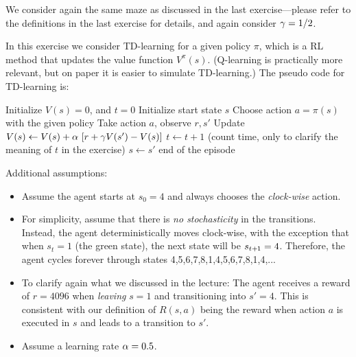 

\renewcommand{\course}{Artificial Intelligence}
\renewcommand{\coursepicture}{course_ai}
\renewcommand{\coursedate}{Summer 2023}

\renewcommand{\exnum}{Exercise 5}

\exercises
{}
\exercisestitle




We consider again the same maze as discussed in the last exercise---please refer to the definitions in the last exercise for details, and again consider $\gamma=1/2$.

In this exercise we consider TD-learning for a given policy $\pi$, which
is a RL method that updates the value function $V^\pi(s)$. (Q-learning
is practically more relevant, but on paper it is easier to simulate
TD-learning.) The pseudo code for TD-learning is:\\
\begin{algo}
\State Initialize $V(s)=0$, and $t=0$
\State Initialize start state $s$
\Repeat {}
\State Choose action $a = \pi(s)$ with the given policy
\State Take action $a$, observe $r, s'$
\State Update $V(s) \gets V(s) + \alpha~ [r + \gamma V(s') - V(s)]$ \label{stepUp}
\State $t\gets t+1$ (count time, only to clarify the meaning of $t$ in the exercise)
\State $s\gets s'$
\Until end of the episode
\end{algo}

Additional assumptions:
\begin{itemize}
\item Assume the agent starts at $s_0=4$ and always chooses the \emph{clock-wise} action.

\item For simplicity, assume that there is \emph{no stochasticity} in the transitions. Instead, the agent deterministically moves clock-wise, with the exception that when $s_t=1$ (the green state), the next state will be $s_{t{{\hspace*{-.0pt}\text{\rm +}\hspace*{-.5pt}}1}}=4$. Therefore, the agent cycles forever through states 4,5,6,7,8,1,4,5,6,7,8,1,4,...

\item To clarify again what we discussed in the lecture:
The agent receives a reward of $r=4096$ when \emph{leaving} $s=1$ and transitioning into $s'=4$. This is consistent with our definition of $R(s,a)$ being the reward when action $a$ is executed in $s$ and leads to a transition to $s'$.

\item Assume a learning rate $\alpha=0.5$.
\end{itemize}

